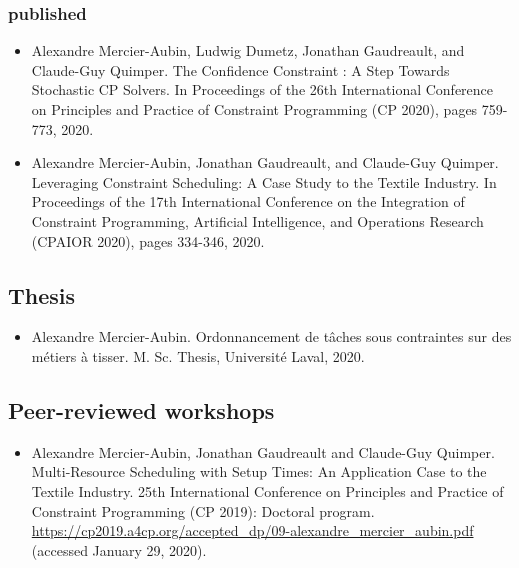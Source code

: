 \documentclass[10pt]{article} %
\begin{document}
\subsubsection{published}
\begin{itemize}

\item
Alexandre Mercier-Aubin, Ludwig Dumetz, Jonathan Gaudreault, and Claude-Guy Quimper. The Confidence Constraint : A Step Towards Stochastic CP Solvers. In Proceedings of the 26th International Conference on Principles and Practice of Constraint Programming (CP 2020), pages 759-773, 2020.

\item
Alexandre Mercier-Aubin, Jonathan Gaudreault, and Claude-Guy Quimper. Leveraging Constraint Scheduling: A Case Study to the Textile Industry. In Proceedings of the 17th International Conference on the Integration of Constraint Programming, Artificial Intelligence, and Operations Research (CPAIOR 2020), pages 334-346, 2020.

\end{itemize}

\subsection{Thesis}
\begin{itemize}
\item
Alexandre Mercier-Aubin. Ordonnancement de tâches sous contraintes sur des métiers à tisser. M. Sc. Thesis, Université Laval, 2020.
\end{itemize}

\subsection{Peer-reviewed workshops}
\begin{itemize}

\item
Alexandre Mercier-Aubin, Jonathan Gaudreault and Claude-Guy Quimper. Multi-Resource Scheduling with Setup Times: An Application Case to the Textile Industry. 25th International Conference on Principles and Practice of Constraint Programming (CP 2019): Doctoral program.
\url{https://cp2019.a4cp.org/accepted_dp/09-alexandre_mercier_aubin.pdf} (accessed January 29, 2020).

\end{itemize}


\end{document}
